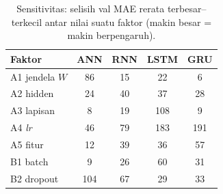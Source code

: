 \begin{table}[t]
\centering
\scriptsize
\caption{Sensitivitas: selisih val MAE rerata terbesar--terkecil antar nilai suatu faktor (makin besar = makin berpengaruh).}
\label{tab:sens}
\begin{tabular}{@{}lcccc@{}}
\toprule
Faktor & ANN & RNN & LSTM & GRU \\
\midrule
A1 jendela $W$ & 86 & 15 & 22 & 6 \\
A2 hidden & 24 & 40 & 37 & 28 \\
A3 lapisan & 8 & 19 & 108 & 9 \\
A4 \textit{lr} & 46 & 79 & 183 & 191 \\
A5 fitur & 12 & 39 & 36 & 57 \\
B1 batch & 9 & 26 & 60 & 31 \\
B2 dropout & 104 & 67 & 29 & 33 \\
\bottomrule
\end{tabular}
\end{table}